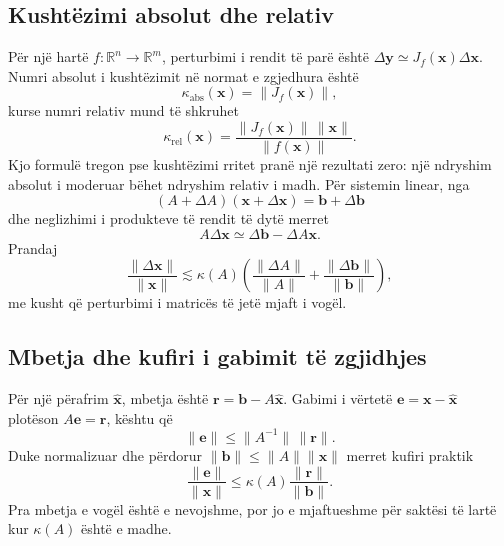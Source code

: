 \documentclass[11pt,oneside,openany]{book}
\newcommand{\vect}[1]{\bm{#1}}
\newcommand{\R}{\mathbb{R}}
\begin{document}
\subsection{Kushtëzimi absolut dhe relativ}
Për një hartë $f:\R^n\to\R^m$, perturbimi i rendit të parë është $\Delta\vect y\simeq J_f(\vect x)\Delta\vect x$. Numri absolut i kushtëzimit në normat e zgjedhura është
\begin{equation}
 \kappa_{\mathrm{abs}}(\vect x)=\|J_f(\vect x)\|,
\end{equation}
kurse numri relativ mund të shkruhet
\begin{equation}
 \kappa_{\mathrm{rel}}(\vect x)=
 \frac{\|J_f(\vect x)\|\,\|\vect x\|}{\|f(\vect x)\|}.
\end{equation}
Kjo formulë tregon pse kushtëzimi rritet pranë një rezultati zero: një ndryshim absolut i moderuar bëhet ndryshim relativ i madh. Për sistemin linear, nga
\begin{equation}
 (A+\Delta A)(\vect x+\Delta\vect x)=\vect b+\Delta\vect b
\end{equation}
dhe neglizhimi i produkteve të rendit të dytë merret
\begin{equation}
 A\Delta\vect x\simeq\Delta\vect b-\Delta A\vect x.
\end{equation}
Prandaj
\begin{equation}
 \frac{\|\Delta\vect x\|}{\|\vect x\|}
 \lesssim\kappa(A)\left(
 \frac{\|\Delta A\|}{\|A\|}+\frac{\|\Delta\vect b\|}{\|\vect b\|}
 \right),
\end{equation}
me kusht që perturbimi i matricës të jetë mjaft i vogël.

\subsection{Mbetja dhe kufiri i gabimit të zgjidhjes}
Për një përafrim $\widehat{\vect x}$, mbetja është $\vect r=\vect b-A\widehat{\vect x}$. Gabimi i vërtetë $\vect e=\vect x-\widehat{\vect x}$ plotëson $A\vect e=\vect r$, kështu që
\begin{equation}
 \|\vect e\|\le\|A^{-1}\|\,\|\vect r\|.
\end{equation}
Duke normalizuar dhe përdorur $\|\vect b\|\le\|A\|\|\vect x\|$ merret kufiri praktik
\begin{equation}
 \frac{\|\vect e\|}{\|\vect x\|}
 \le \kappa(A)\frac{\|\vect r\|}{\|\vect b\|}.
\end{equation}
Pra mbetja e vogël është e nevojshme, por jo e mjaftueshme për saktësi të lartë kur $\kappa(A)$ është e madhe.
\end{document}
